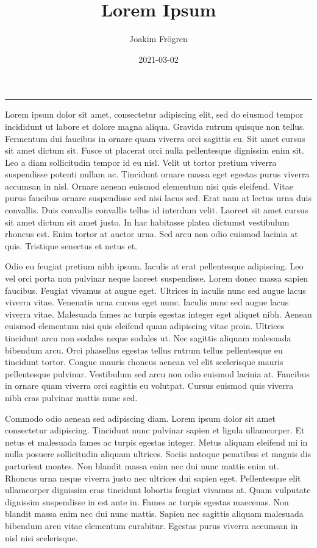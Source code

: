 \documentclass[]{tufte-handout}
\title[Lorem Ipsum]{Lorem Ipsum}
\author{Joakim Frögren}
\date{2021-03-02}
\begin{document}
\maketitle




\begin{center}\rule{0.5\linewidth}{0.5pt}\end{center}


Lorem ipsum dolor sit amet, consectetur adipiscing elit, sed do eiusmod
tempor incididunt ut labore et dolore magna aliqua. Gravida rutrum
quisque non tellus. Fermentum dui faucibus in ornare quam viverra orci
sagittis eu. Sit amet cursus sit amet dictum sit. Fusce ut placerat orci
nulla pellentesque dignissim enim sit. Leo a diam sollicitudin tempor id
eu nisl. Velit ut tortor pretium viverra suspendisse potenti nullam ac.
Tincidunt ornare massa eget egestas purus viverra accumsan in nisl.
Ornare aenean euismod elementum nisi quis eleifend. Vitae purus faucibus
ornare suspendisse sed nisi lacus sed. Erat nam at lectus urna duis
convallis. Duis convallis convallis tellus id interdum velit. Laoreet
sit amet cursus sit amet dictum sit amet justo. In hac habitasse platea
dictumst vestibulum rhoncus est. Enim tortor at auctor urna. Sed arcu
non odio euismod lacinia at quis. Tristique senectus et netus et.

Odio eu feugiat pretium nibh ipsum. Iaculis at erat pellentesque
adipiscing. Leo vel orci porta non pulvinar neque laoreet suspendisse.
Lorem donec massa sapien faucibus. Feugiat vivamus at augue eget.
Ultrices in iaculis nunc sed augue lacus viverra vitae. Venenatis urna
cursus eget nunc. Iaculis nunc sed augue lacus viverra vitae. Malesuada
fames ac turpis egestas integer eget aliquet nibh. Aenean euismod
elementum nisi quis eleifend quam adipiscing vitae proin. Ultrices
tincidunt arcu non sodales neque sodales ut. Nec sagittis aliquam
malesuada bibendum arcu. Orci phasellus egestas tellus rutrum tellus
pellentesque eu tincidunt tortor. Congue mauris rhoncus aenean vel elit
scelerisque mauris pellentesque pulvinar. Vestibulum sed arcu non odio
euismod lacinia at. Faucibus in ornare quam viverra orci sagittis eu
volutpat. Cursus euismod quis viverra nibh cras pulvinar mattis nunc
sed.

Commodo odio aenean sed adipiscing diam. Lorem ipsum dolor sit amet
consectetur adipiscing. Tincidunt nunc pulvinar sapien et ligula
ullamcorper. Et netus et malesuada fames ac turpis egestas integer.
Metus aliquam eleifend mi in nulla posuere sollicitudin aliquam
ultrices. Sociis natoque penatibus et magnis dis parturient montes. Non
blandit massa enim nec dui nunc mattis enim ut. Rhoncus urna neque
viverra justo nec ultrices dui sapien eget. Pellentesque elit
ullamcorper dignissim cras tincidunt lobortis feugiat vivamus at. Quam
vulputate dignissim suspendisse in est ante in. Fames ac turpis egestas
maecenas. Non blandit massa enim nec dui nunc mattis. Sapien nec
sagittis aliquam malesuada bibendum arcu vitae elementum curabitur.
Egestas purus viverra accumsan in nisl nisi scelerisque.
\end{document}

